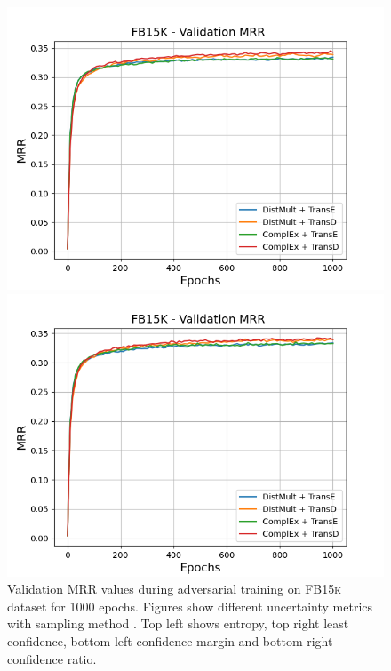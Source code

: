 \begin{figure}[H]
\begin{minipage}{.5\textwidth}
    \end{minipage}
    \begin{minipage}{.5\textwidth}
      \centering
      \includegraphics[width=0.9\linewidth]{figures/results/gan_train/not_pretrained/uncertainty/max_distribution/confidence_margin/fb15k/uncertainty_fb15k_mrrs.png}
    \end{minipage}%
    \begin{minipage}{.5\textwidth}
      \centering
      \includegraphics[width=0.9\linewidth]{figures/results/gan_train/not_pretrained/uncertainty/max_distribution/confidence_ratio/fb15k/uncertainty_fb15k_mrrs.png}
    \end{minipage}%
    \caption{Validation MRR values during adversarial training on \textsc{FB15k} dataset for 1000 epochs. 
    Figures show different uncertainty metrics with sampling method  \ussoftmax.
    Top left shows entropy, top right least confidence, 
    bottom left confidence margin and bottom right confidence ratio.}
    \label{fig:advtrain_metrics_fb15k}
\end{figure}

